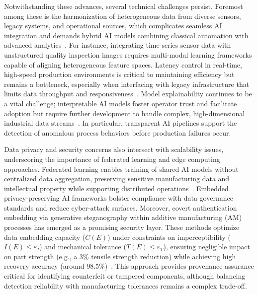 \documentclass[sigconf]{acmart}
\begin{document}
Notwithstanding these advances, several technical challenges persist. Foremost among these is the harmonization of heterogeneous data from diverse sensors, legacy systems, and operational sources, which complicates seamless AI integration and demands hybrid AI models combining classical automation with advanced analytics~\cite{ref10,ref20,ref36}. For instance, integrating time-series sensor data with unstructured quality inspection images requires multi-modal learning frameworks capable of aligning heterogeneous feature spaces. Latency control in real-time, high-speed production environments is critical to maintaining efficiency but remains a bottleneck, especially when interfacing with legacy infrastructure that limits data throughput and responsiveness~\cite{ref10,ref42}. Model explainability continues to be a vital challenge; interpretable AI models foster operator trust and facilitate adoption but require further development to handle complex, high-dimensional industrial data streams~\cite{ref10,ref42}. In particular, transparent AI pipelines support the detection of anomalous process behaviors before production failures occur.

Data privacy and security concerns also intersect with scalability issues, underscoring the importance of federated learning and edge computing approaches. Federated learning enables training of shared AI models without centralized data aggregation, preserving sensitive manufacturing data and intellectual property while supporting distributed operations~\cite{ref29,ref36}. Embedded privacy-preserving AI frameworks bolster compliance with data governance standards and reduce cyber-attack surfaces. Moreover, covert authentication embedding via generative steganography within additive manufacturing (AM) processes has emerged as a promising security layer. These methods optimize data embedding capacity ($C(E)$) under constraints on imperceptibility ($I(E) \leq \varepsilon_I$) and mechanical tolerance ($T(E) \leq \varepsilon_T$), ensuring negligible impact on part strength (e.g., a 3\% tensile strength reduction) while achieving high recovery accuracy (around 98.5\%)~\cite{ref10}. This approach provides provenance assurance critical for identifying counterfeit or tampered components, although balancing detection reliability with manufacturing tolerances remains a complex trade-off.
\end{document}
